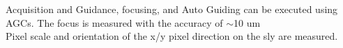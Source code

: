 \begin{itembox}[l]{}
Acquisition and Guidance, focusing, and Auto Guiding can be executed using AGCs.
The focus is measured with the accuracy of $\sim$10 um \\

Pixel scale and orientation of the x/y pixel direction on the sly are measured.

\end{itembox}